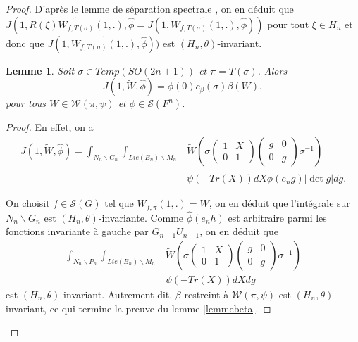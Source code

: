\documentclass{amsart}
\newtheorem{lemme}{Lemme}[section]
\begin{document}
\begin{proof}
D'après le lemme de séparation spectrale \cite[Lemme 5.7.2]{beuzart-plessis}, on en déduit que
$J(1, \widetilde{R(\xi)W_{f, T(\sigma)}(1,.)}, \widehat{\phi} = J(1, \widetilde{W_{f, T(\sigma)}(1,.)}, \widehat{\phi}))$ pour tout $\xi \in H_n$ et donc que $J(1, \widetilde{W_{f, T(\sigma)}(1,.)}, \widehat{\phi}))$ est $(H_n, \theta)$-invariant.

\begin{lemme}
\label{zetabeta}
Soit $\sigma \in Temp(SO(2n+1))$ et $\pi = T(\sigma)$. Alors
\begin{equation}
J(1, \widetilde{W}, \widehat{\phi}) = \phi(0)c_\beta(\sigma)\beta(W),
\end{equation}
pour tous $W \in \mathcal{W}(\pi, \psi)$ et $\phi \in \mathcal{S}(F^n)$.
\end{lemme}

\begin{proof}
En effet, on a
\begin{equation}
\begin{split}
J(1, \widetilde{W}, \widehat{\phi}) = \int_{N_n \backslash G_n} \int_{Lie(B_n) \backslash M_n} &\widetilde{W}\left(\sigma\begin{pmatrix}
1 & X \\
0 & 1
\end{pmatrix} \begin{pmatrix}
g & 0 \\
0 & g
\end{pmatrix} \sigma^{-1}\right) \\
& \psi(-Tr(X)) dX \widehat{\phi}(e_ng) |\det g| dg.
\end{split}
\end{equation}

On choisit $f \in \mathcal{S}(G)$ tel que $W_{f,\pi}(1,.) = W$, on en déduit que l'intégrale sur $N_n \backslash G_n$ est $(H_n, \theta)$-invariante. Comme $\widehat{\phi}(e_nh)$ est arbitraire parmi les fonctions invariante à gauche par $G_{n-1}U_{n-1}$, on en déduit que
\begin{equation}
\begin{split}
\int_{N_n \backslash P_n} \int_{Lie(B_n) \backslash M_n} &\widetilde{W}\left(\sigma\begin{pmatrix}
1 & X \\
0 & 1
\end{pmatrix} \begin{pmatrix}
g & 0 \\
0 & g
\end{pmatrix} \sigma^{-1}\right) \\
& \psi(-Tr(X)) dX dg
\end{split}
\end{equation}
est $(H_n, \theta)$-invariant. Autrement dit, $\beta$ restreint à $\mathcal{W}(\pi, \psi)$ est $(H_n, \theta)$-invariant, ce qui termine la preuve du lemme \ref{lemmebeta}.


\end{proof}
\end{proof}
\end{document}
